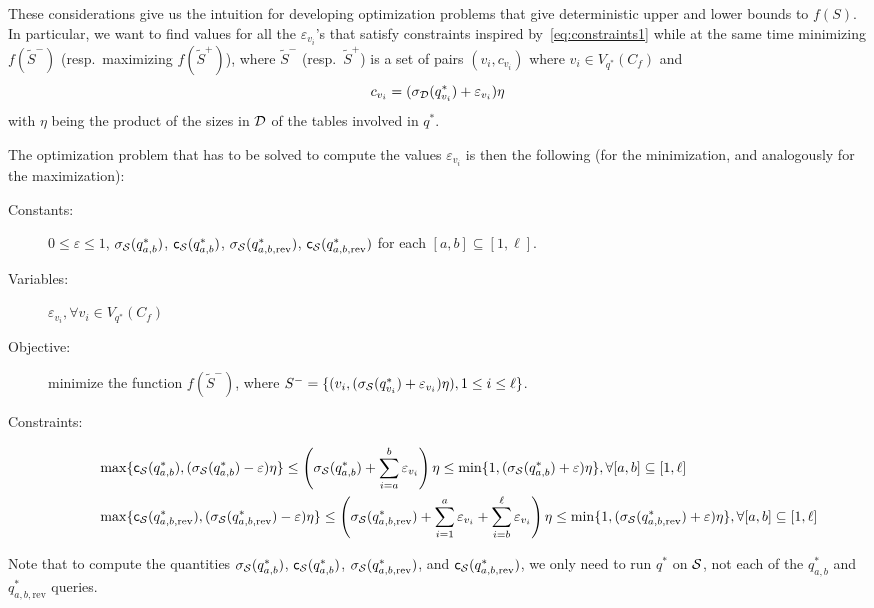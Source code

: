 These considerations give us the intuition for developing optimization
problems that give deterministic upper and lower bounds to $f(S)$.
In particular, we want to find values for all the $\varepsilon_{v_i}$'s that
satisfy constraints inspired by~\eqref{eq:constraints1} while at the same
time minimizing $f(\tilde S^-)$ (resp.~maximizing $f(\tilde S^+)$), where
$\tilde S^-$ (resp.~$\tilde S^+$) is a set of pairs
$(v_i,c_{v_i})$ where $v_i\in V_{q^*}(C_f)$ and 
\[
c_{v_i} = (\sigma_{\cal D}(q^*_{v_i})+\varepsilon_{v_i})\eta
\]
with $\eta$ being the product of the sizes in ${\cal D}$ of the tables involved in
$q^*$.

The optimization problem that has to be solved to compute the values
$\varepsilon_{v_i}$ is then the following (for the minimization, and analogously
for the maximization):
\begin{description}
  \item[Constants:] $0\le\varepsilon\le 1$,
    $\sigma_{\cal S}(q^*_{a,b})$, $\mathsf{c}_{\cal S}(q^*_{a,b})$,
    $\sigma_{\cal S}(q^*_{a,b,\mathrm{rev}})$,
    $\mathsf{c}_{\cal S}(q^*_{a,b,\mathrm{rev}})$ for each $[a,b]\subseteq[1,\ell]$.
  \item[Variables:] $\varepsilon_{v_i}, \forall v_i\in V_{q^*}(C_f)$ 
  \item[Objective:] minimize the function $f(\tilde S^-)$, where
    $S^-=\{(v_i,(\sigma_{\cal S}(q^*_{v_i})+\varepsilon_{v_i})\eta), 1\le i\le
    \ell\}$.
  \item[Constraints:]
    \begin{align*}
    &\max\{\mathsf{c}_{\cal S}(q^*_{a,b}),
    (\sigma_{\cal S}(q^*_{a,b})-\varepsilon)\eta\} \le
    \left(\sigma_{\cal S}(q^*_{a,b})+\sum_{i=a}^b\varepsilon_{v_i}\right)\eta \le
    \min\{1,(\sigma_{\cal S}(q^*_{a,b})+\varepsilon)\eta\}, \forall
    [a,b]\subseteq[1,\ell] \\
    &\max\{\mathsf{c}_{\cal S}(q^*_{a,b,\mathrm{rev}}),
    (\sigma_{\cal S}(q^*_{a,b,\mathrm{rev}})-\varepsilon)\eta\} \le
    \left(\sigma_{\cal S}(q^*_{a,b,\mathrm{rev}})+\sum_{i=1}^a\varepsilon_{v_i}+\sum_{i=b}^\ell\varepsilon_{v_i}\right)\eta \le
    \min\{1,(\sigma_{\cal S}(q^*_{a,b,\mathrm{rev}})+\varepsilon)\eta\}, \forall [a,b]\subseteq[1,\ell]
    \end{align*}
\end{description}
Note that to compute the quantities $\sigma_{\cal S}(q^*_{a,b})$,
$\mathsf{c}_{\cal S}(q^*_{a,b})$, $\sigma_{\cal S}(q^*_{a,b,\mathrm{rev}})$, and
$\mathsf{c}_{\cal S}(q^*_{a,b,\mathrm{rev}})$, we only need to run $q^*$ on ${\cal S}$, not
each of the $q^*_{a,b}$ and $q^*_{a,b,\mathrm{rev}}$ queries.

